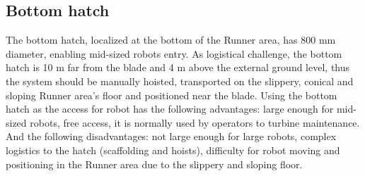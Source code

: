 \subsection{Bottom hatch}\label{bottom}
The bottom hatch, localized at the bottom of the Runner area, has 800 mm
diameter, enabling mid-sized robots entry. As logistical challenge, the bottom
hatch is 10 m far from the blade and 4 m above the external ground level,
thus the system should be manually hoisted, transported on the slippery, conical
and sloping Runner area's floor and positioned near the blade. Using the bottom
hatch as the access for robot has the following advantages: large enough for
mid-sized robots, free access, it is normally used by operators to turbine
maintenance. And the following disadvantages: not large enough for large robots,
complex logistics to the hatch (scaffolding and hoists), difficulty for robot
moving and positioning in the Runner area due to the slippery and sloping floor.





